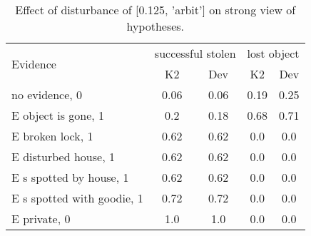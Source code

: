 \begin{table}\begin{tabular}{l|cc|cc}\toprule\multirow{2}{*}{Evidence} & \multicolumn{2}{c}{successful stolen}& \multicolumn{2}{c}{lost object}\\& {K2} & {Dev}& {K2} & {Dev}\\\midrule
no evidence, 0 & 0.06&0.06&\cellcolor{Bittersweet}0.19&\cellcolor{Bittersweet}0.25\\E object is gone, 1 & 0.2&0.18&0.68&0.71\\E broken lock, 1 & 0.62&0.62&0.0&0.0\\E disturbed house, 1 & 0.62&0.62&0.0&0.0\\E s spotted by house, 1 & 0.62&0.62&0.0&0.0\\E s spotted with goodie, 1 & 0.72&0.72&0.0&0.0\\E private, 0 & 1.0&1.0&0.0&0.0\\\bottomrule\end{tabular}\caption{Effect of disturbance of [0.125, 'arbit'] on strong view of hypotheses.}\end{table}